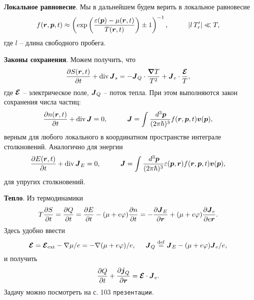 
\textbf{Локальное равновесие}.
Мы в дальнейшем будем верить в локальное равновесие
\begin{equation*}
	f(\vc{r}, \vc{p}, t) \approx \left(
	 \exp \left(\frac{\varepsilon(\vc{p})-\mu(\vc{r}, t)}{T(\vc{r}, t)}\right) \pm 1
	\right)^{-1},
	\hspace{10 mm} 
	|l \, T_r'| \ll T,
\end{equation*}
где $l$ -- длина свободного пробега.


\textbf{Законы сохранения}.
Можем получить, что
\begin{equation*}
	\frac{\partial S(\boldsymbol{r}, t)}{\partial t} + \mathop{\mathrm{div}}\nolimits \boldsymbol{J}_s = - \boldsymbol{J}_Q \cdot \frac{\boldsymbol{\nabla} T}{T^2} + \boldsymbol{J}_e \cdot \frac{\boldsymbol{\mathcal E}}{T},
\end{equation*}
где $\boldsymbol{\mathcal E}$ -- электрическое поле, $\boldsymbol{J}_Q$ -- поток тепла. При этом выполняются закон сохранения числа частиц:
\begin{equation*}
	\frac{\partial n(\vc{r}, t)}{\partial t} + \div \vc{J} = 0,
	\hspace{10 mm} 
	\vc{J} = \int \frac{\d^3 \vc{p}}{(2\pi \hbar)^3} f(\vc{r}, \vc{p}, t) \vc{v}(\vc{p}),
\end{equation*}
верным для любого локального в координатном пространстве интеграле столкновений. Аналогично для энергии
\begin{equation*}
	\frac{\partial E(\vc{r}, t)}{\partial t} + \div \vc{J}_E = 0,
	\hspace{10 mm} 
	\vc{J} = \int \frac{\d^3 \vc{p}}{(2\pi \hbar)^3} \varepsilon(\vc{p}, \vc{r}) f(\vc{r}, \vc{p}, t) \vc{v}(\vc{p}),
\end{equation*}
для упругих столкновений.


\textbf{Тепло}. Из термодинамики
\begin{equation*}
	T \frac{\partial S}{\partial t} = \frac{\partial Q}{\partial t} = \frac{\partial E}{\partial t} - (\mu + e \varphi) \frac{\partial n}{\partial t} = - \frac{\partial \boldsymbol{J}_E}{\partial \boldsymbol{r}} + (\mu + e \varphi) \frac{\partial \boldsymbol{J}_e}{\partial e \boldsymbol{r}}.
\end{equation*}
Здесь удобно ввести
\begin{equation*}
	\boldsymbol{\mathcal E} = \boldsymbol{\mathcal E}_{\textnormal{ext}} - \nabla \mu / e = - \nabla (\mu + e \varphi) / e,
	\hspace{5 mm} 
	\boldsymbol{J}_Q \overset{\mathrm{def}}{=} \boldsymbol{J}_E - (\mu + e \varphi) \boldsymbol{J}_e / e,
\end{equation*}
и получить 
\begin{equation*}
	\frac{\partial Q}{\partial t} + \frac{\partial \boldsymbol{j}_Q}{\partial \boldsymbol{r}} = \boldsymbol{\mathcal E} \cdot \boldsymbol{J}_e. 
\end{equation*}
Задачу можно посмотреть на с. 103 \texttt{презентации}. 

